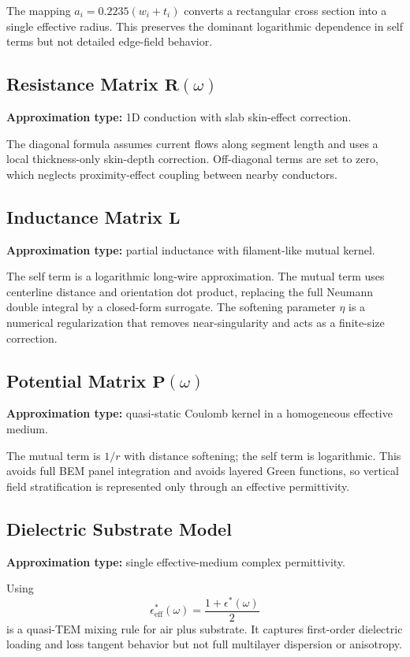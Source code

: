 \documentclass[11pt]{article}
\begin{document}
The mapping $a_i=0.2235(w_i+t_i)$ converts a rectangular cross section into a single effective radius.
This preserves the dominant logarithmic dependence in self terms but not detailed edge-field behavior.

\subsection{Resistance Matrix $\bm{R}(\omega)$}
\textbf{Approximation type:} 1D conduction with slab skin-effect correction.

The diagonal formula assumes current flows along segment length and uses a local thickness-only skin-depth correction.
Off-diagonal terms are set to zero, which neglects proximity-effect coupling between nearby conductors.

\subsection{Inductance Matrix $\bm{L}$}
\textbf{Approximation type:} partial inductance with filament-like mutual kernel.

The self term is a logarithmic long-wire approximation.
The mutual term uses centerline distance and orientation dot product, replacing the full Neumann double integral by a closed-form surrogate.
The softening parameter $\eta$ is a numerical regularization that removes near-singularity and acts as a finite-size correction.

\subsection{Potential Matrix $\bm{P}(\omega)$}
\textbf{Approximation type:} quasi-static Coulomb kernel in a homogeneous effective medium.

The mutual term is $1/r$ with distance softening; the self term is logarithmic.
This avoids full BEM panel integration and avoids layered Green functions, so vertical field stratification is represented only through an effective permittivity.

\subsection{Dielectric Substrate Model}
\textbf{Approximation type:} single effective-medium complex permittivity.

Using
\[
\epsilon_{\mathrm{eff}}^*(\omega)=\frac{1+\epsilon^*(\omega)}{2}
\]
is a quasi-TEM mixing rule for air plus substrate.
It captures first-order dielectric loading and loss tangent behavior but not full multilayer dispersion or anisotropy.
\end{document}
